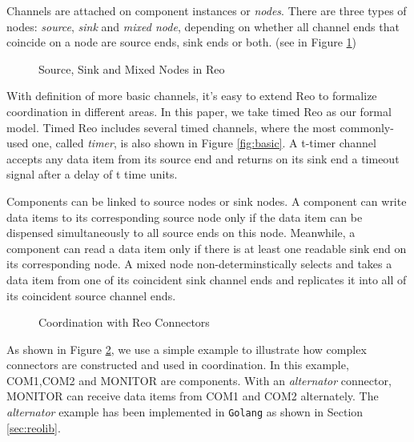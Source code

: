 \documentclass[conference, a4paper]{IEEEtran}
\begin{document}
Channels are attached on component instances or \emph{nodes}. There are three types of nodes:
\emph{source}, \emph{sink} and \emph{mixed node}, depending on whether all channel ends that
coincide on a node are source ends, sink ends or both. (see in Figure \ref{fig:node})

\begin{figure}[h]
  \begin{center}
    
  \end{center}
  \caption{Source, Sink and Mixed Nodes in Reo}
  \label{fig:node}
\end{figure}



With definition of more basic channels, it's easy to extend Reo to formalize coordination in
different areas. In this paper, we take timed Reo\cite{DBLP:conf/sefm/ArbabBBR04} as our formal
model. Timed Reo includes several timed channels, where the most commonly-used one, called
\emph{timer}, is also shown in Figure \ref{fig:basic}. A t-timer channel accepts any data item from
its source end and returns on its sink end a timeout signal after a delay of t time units.

Components can be linked to source nodes or sink nodes. A component can write data items to its
corresponding source node only if the data item can be dispensed simultaneously to all source ends
on this node. Meanwhile, a component can read a data item only if there is at least one readable
sink end on its corresponding node. A mixed node non-determinstically selects and takes a data item
from one of its coincident sink channel ends and replicates it into all of its coincident source
channel ends.

\begin{figure}[h]
  \begin{center}
    
  \end{center}
  \caption{Coordination with Reo Connectors}
  \label{fig:reoconnector}
\end{figure}

As shown in Figure \ref{fig:reoconnector}, we use a simple example to illustrate how complex
connectors are constructed and used in coordination. In this example, COM1,COM2 and
MONITOR are components. With an \emph{alternator} connector, MONITOR can receive data items from
COM1 and COM2 alternately. The \emph{alternator} example has been implemented in \texttt{Golang} as
shown in Section \ref{sec:reolib}.
\end{document}
